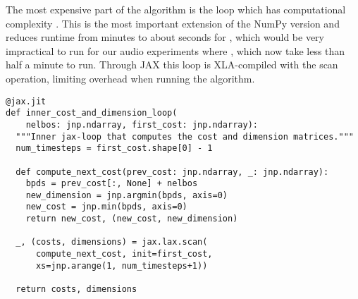 \documentclass{article} \usepackage{iclr2022_conference,times}
\begin{document}
The most expensive part of the algorithm is the loop which has computational complexity . This is the most important extension of the NumPy version and reduces runtime from  minutes to about  seconds for , which would be very impractical to run for our audio experiments where , which now take less than half a minute to run. Through JAX this loop is XLA-compiled with the scan operation, limiting overhead when running the algorithm. 
\begin{lstlisting}
@jax.jit
def inner_cost_and_dimension_loop(
    nelbos: jnp.ndarray, first_cost: jnp.ndarray):
  """Inner jax-loop that computes the cost and dimension matrices."""
  num_timesteps = first_cost.shape[0] - 1

  def compute_next_cost(prev_cost: jnp.ndarray, _: jnp.ndarray):
    bpds = prev_cost[:, None] + nelbos
    new_dimension = jnp.argmin(bpds, axis=0)
    new_cost = jnp.min(bpds, axis=0)
    return new_cost, (new_cost, new_dimension)

  _, (costs, dimensions) = jax.lax.scan(
      compute_next_cost, init=first_cost,
      xs=jnp.arange(1, num_timesteps+1))

  return costs, dimensions
\end{lstlisting}
\end{document}
